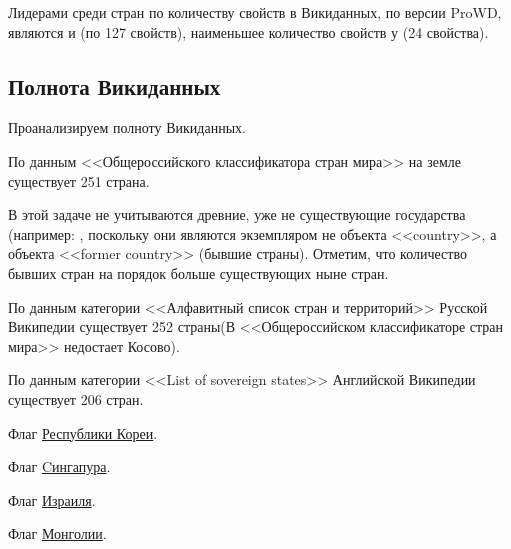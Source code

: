 Лидерами среди стран по количеству свойств в Викиданных, по версии ProWD, являются  и  (по 127 свойств), наименьшее количество свойств у  (24 свойства).


\subsection{Полнота Викиданных}

Проанализируем полноту Викиданных.

По данным <<Общероссийского классификатора стран мира>> на земле существует 251 страна.

В этой задаче не учитываются древние, уже не существующие государства (например: , поскольку они являются экземпляром не объекта <<country>>, а объекта <<former country>> (бывшие страны). Отметим, что количество бывших стран на порядок больше существующих ныне стран.

По данным категории <<Алфавитный список стран и территорий>> Русской Википедии существует 252 страны(В <<Общероссийском классификаторе стран мира>> недостает Косово).

По данным категории <<List of sovereign states>> Английской Википедии существует 206 стран.

\begin{marginfigure}[0.0cm]
	{
		\setlength{\fboxsep}{0pt}%
		\setlength{\fboxrule}{1pt}%
	}
	\caption{Флаг \href{https://w.wiki/mzc}{Республики Кореи}.}%
	\label{fig:flag_kor}%
\end{marginfigure}
\begin{marginfigure}[0.0cm]
	{
		\setlength{\fboxsep}{0pt}%
		\setlength{\fboxrule}{1pt}%
	}
	\caption{Флаг \href{https://w.wiki/mzd}{Cингапура}.}%
	\label{fig:flag_singapore}%
\end{marginfigure}
\begin{marginfigure}[0.0cm]
	{
		\setlength{\fboxsep}{0pt}%
		\setlength{\fboxrule}{1pt}%
	}
	\caption{Флаг \href{https://w.wiki/mzh}{Израиля}.}%
	\label{fig:flag_israel}%
\end{marginfigure}
\begin{marginfigure}[0.0cm]
	{
		\setlength{\fboxsep}{0pt}%
		\setlength{\fboxrule}{1pt}%
	}
	\caption{Флаг \href{https://w.wiki/mze}{Монголии}.}%
	\label{fig:flag_mongolia}%
\end{marginfigure}

